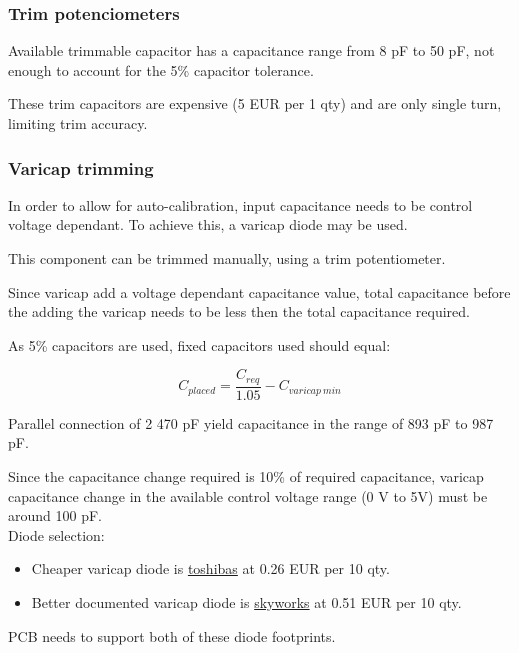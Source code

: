 \documentclass[11pt]{article}
\begin{document}
\subsubsection{Trim potenciometers}
Available trimmable capacitor has a capacitance range from 8 pF to 50 pF, not 
enough to account for the 5\% capacitor tolerance.

These trim capacitors are expensive (5 EUR per 1 qty) and are only single turn,
limiting trim accuracy. 


\subsubsection{Varicap trimming}
In order to allow for auto-calibration, input capacitance needs to be control
voltage dependant. To achieve this, a varicap diode may be used.

This component can be trimmed manually, using a trim potentiometer.

Since varicap add a voltage dependant capacitance value, total capacitance before
the adding the varicap needs to be less then the total capacitance required. 

As 5\% capacitors are used, fixed capacitors used should equal:

\begin{equation}
  C_{placed} = \frac{C_{req}}{1.05} - C_{varicap\ min}
  \label{eq:}
\end{equation}

Parallel connection of 2 470 pF yield capacitance in the range of 893 pF to 987 pF.

Since the capacitance change required is 10\% of required capacitance, varicap 
capacitance change in the available control voltage range (0 V to 5V) must be around
100 pF.\\

Diode selection:
\begin{itemize}
  \item Cheaper varicap diode is \href{https://eu.mouser.com/ProductDetail/Toshiba/1SV324TPH3F?qs=EEns8I54Y6DPMP6VMy8m2w%3D%3D}{toshibas}
  at 0.26 EUR per 10 qty. 

  \item Better documented varicap diode is \href{https://eu.mouser.com/ProductDetail/Skyworks-Solutions-Inc/SMV1255-079LF?qs=WMHGlxXAKT8jslp0hTOZuw%3D%3D}{skyworks} 
  at 0.51 EUR per 10 qty. 
\end{itemize}

PCB needs to support both of these diode footprints.
\end{document}
